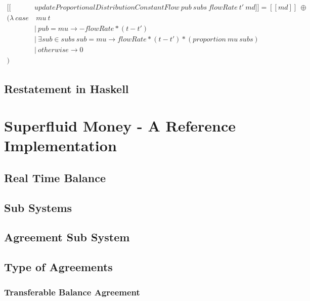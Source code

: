 \documentclass[a4paper,10pt]{report}
\begin{document}
\begin{equation}\label{sem_distributeProportionally}
    \begin{split}
        [\![&updateProportionalDistributionConstantFlow\ pub\ subs\ flowRate\ t'\ md]\!] = [\![md]\!]\ \oplus \\
        (\lambda\ case&\ mu\ t \\
        &|\ pub = mu \rightarrow -flowRate * (t - t') \\
        &|\ \exists sub \in subs\ { sub = mu } \rightarrow flowRate * (t - t') * (proportion\ mu\ subs) \\
        &|\ otherwise \rightarrow 0 \\
        )
    \end{split}
\end{equation}

\section{Restatement in Haskell}

\chapter{Superfluid Money - A Reference Implementation}

\section{Real Time Balance}

\section{Sub Systems}

\section{Agreement Sub System}

\section{Type of Agreements}

\subsection{Transferable Balance Agreement}
\end{document}
